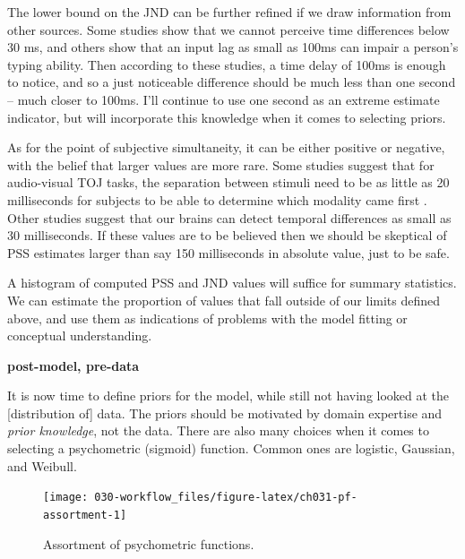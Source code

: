 \documentclass[11pt, oneside, openany]{scrbook}
\begin{document}
The lower bound on the JND can be further refined if we draw information from other sources. Some studies show that we cannot perceive time differences below 30 ms, and others show that an input lag as small as 100ms can impair a person's typing ability. Then according to these studies, a time delay of 100ms is enough to notice, and so a just noticeable difference should be much less than one second -- much closer to 100ms. I'll continue to use one second as an extreme estimate indicator, but will incorporate this knowledge when it comes to selecting priors.

As for the point of subjective simultaneity, it can be either positive or negative, with the belief that larger values are more rare. Some studies suggest that for audio-visual TOJ tasks, the separation between stimuli need to be as little as 20 milliseconds for subjects to be able to determine which modality came first \citep{vatakis2007influence}. Other studies suggest that our brains can detect temporal differences as small as 30 milliseconds. If these values are to be believed then we should be skeptical of PSS estimates larger than say 150 milliseconds in absolute value, just to be safe.

A histogram of computed PSS and JND values will suffice for summary statistics. We can estimate the proportion of values that fall outside of our limits defined above, and use them as indications of problems with the model fitting or conceptual understanding.

\textbf{post-model, pre-data}

It is now time to define priors for the model, while still not having looked at the {[}distribution of{]} data. The priors should be motivated by domain expertise and \emph{prior knowledge}, not the data. There are also many choices when it comes to selecting a psychometric (sigmoid) function. Common ones are logistic, Gaussian, and Weibull.

\begin{figure}

{\centering \texttt{[image: 030-workflow\_files/figure-latex/ch031-pf-assortment-1]} 

}

\caption{Assortment of psychometric functions.}\label{fig:ch031-pf-assortment}
\end{figure}
\end{document}
